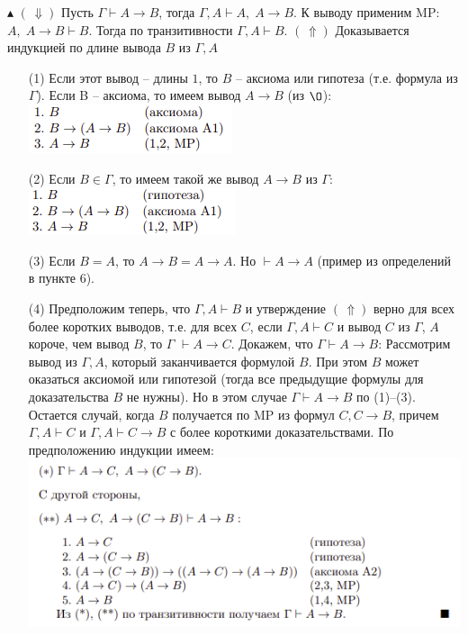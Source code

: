 $\blacktriangle$ $(\,\Downarrow)$ Пусть $\Gamma \vdash A\to B$, тогда $\Gamma, A \vdash A,\; A\to B$. К выводу применим MP: $A,\;A\to B \vdash B$. Тогда по транзитивности $\Gamma, A\vdash B$. \newline $(\,\Uparrow)$ Доказывается индукцией по длине вывода $B$ из $\Gamma, A$
\begin{itemize}
    \item[(1)] Если этот вывод -- длины $1$, то $B$ -- аксиома или гипотеза (т.е. формула из $\Gamma$). \newline Если B -- аксиома, то имеем вывод $A \to B$ (из $\O$): \newline \includegraphics[width=0.35\linewidth]{images/1.1_case1.png}
    \item[(2)] Если $B \in \Gamma$, то имеем такой же вывод $A \to B$ из $\Gamma$: \newline \includegraphics[width=0.35\linewidth]{images/1.1_case2.png}
    \item[(3)] Если $B = A$, то $A \to B = A \to A$. Но $\vdash A \to A$ (пример из определений в пункте 6).
    \item[(4)] Предположим теперь, что $\Gamma, A \vdash B$ и утверждение $(\,\Uparrow)$ верно для всех более коротких выводов, т.е. \newline для всех $C$, если $\Gamma, A \vdash C$ и вывод $C$ из $\Gamma$, $A$ короче, чем вывод $B$, то $\Gamma$ $\vdash A \to C$.
    \newline Докажем, что $\Gamma \vdash A \to B$:
    \newline Рассмотрим вывод из $\Gamma, A$, который заканчивается формулой $B$. При этом $B$ может оказаться аксиомой или гипотезой (тогда все предыдущие формулы для доказательства $B$ не нужны). Но в этом случае  $\Gamma \vdash A \to B$ по (1)–(3).
    \newline Остается случай, когда $B$ получается по MP из формул $C, C \to B$, причем $\Gamma, A \vdash C$ и $\Gamma, A \vdash C \to B$ с более короткими доказательствами. По предположению индукции имеем: \newline
    \includegraphics[width=0.9\linewidth]{images/1.1_case3.png}
\end{itemize}

